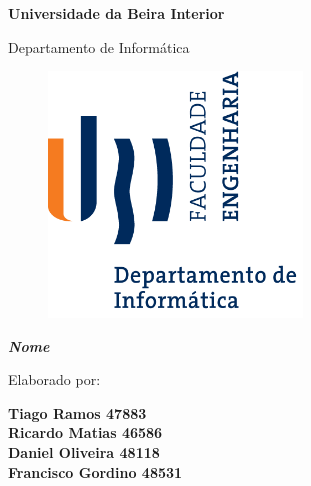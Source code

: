 \documentclass[12pt,a4paper]{memoir}
\begin{document}


\thispagestyle{empty}
\setcounter{page}{-1}

\begin{center}
\begin{Huge}
\textbf{Universidade da Beira Interior}
\end{Huge}
\end{center}

\begin{center}
\begin{Huge}
Departamento de Informática
\end{Huge}
\end{center}

\vspace{0,07cm}
\begin{figure}[!htb]
\centering
\includegraphics[width=191pt]{ubi-fe-di.png}
\end{figure}


\vspace{0.5cm}
\begin{center}
\begin{Large}
\textbf{\emph{Nome}}
\end{Large}
\end{center}


\vspace{0.5cm}
\begin{center}
\begin{normalsize}
\begin{large}
Elaborado por:
\end{large}
\end{normalsize}
\end{center}

\begin{center}
\begin{large}
\textbf{Tiago Ramos 47883 \\ Ricardo Matias 46586 \\ Daniel Oliveira 48118 \\ Francisco Gordino 48531} \\
\end{large}
\end{center}
\end{document}
